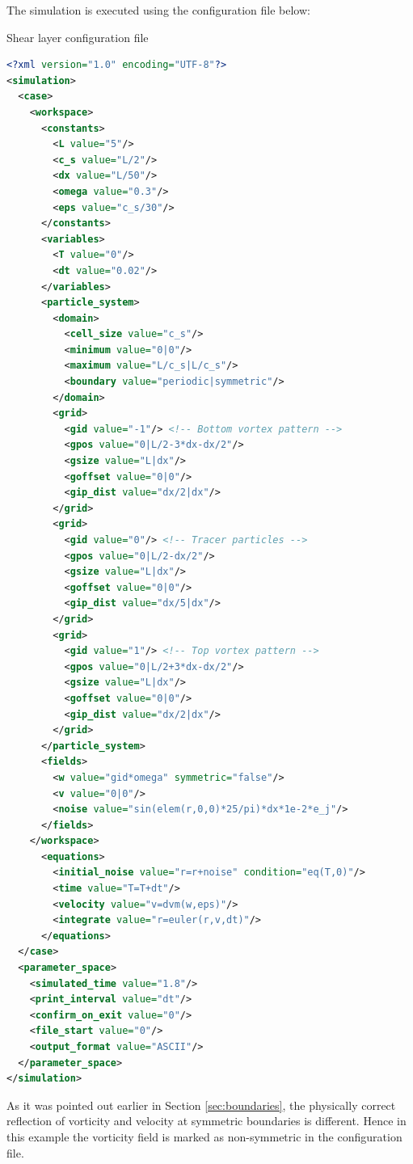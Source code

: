 \documentclass[a4paper,12pt,openany]{book}
\theoremstyle{break}
\begin{document}
The simulation is executed using the configuration file below:
\begin{samepage}
\begin{example}{Shear layer configuration file}{}
\lstset{basicstyle=\tiny}
\begin{lstlisting}[language=XML]
<?xml version="1.0" encoding="UTF-8"?>
<simulation>
  <case>
    <workspace>
      <constants>
        <L value="5"/>
        <c_s value="L/2"/>
        <dx value="L/50"/>
        <omega value="0.3"/>
        <eps value="c_s/30"/>
      </constants>
      <variables>
        <T value="0"/>
        <dt value="0.02"/>
      </variables>
      <particle_system>
        <domain>
          <cell_size value="c_s"/>
          <minimum value="0|0"/>
          <maximum value="L/c_s|L/c_s"/>
          <boundary value="periodic|symmetric"/>
        </domain>
        <grid>
          <gid value="-1"/> <!-- Bottom vortex pattern -->
          <gpos value="0|L/2-3*dx-dx/2"/>
          <gsize value="L|dx"/>
          <goffset value="0|0"/>
          <gip_dist value="dx/2|dx"/>
        </grid>
        <grid>
          <gid value="0"/> <!-- Tracer particles -->
          <gpos value="0|L/2-dx/2"/>
          <gsize value="L|dx"/>
          <goffset value="0|0"/>
          <gip_dist value="dx/5|dx"/>
        </grid>
        <grid>
          <gid value="1"/> <!-- Top vortex pattern -->
          <gpos value="0|L/2+3*dx-dx/2"/>
          <gsize value="L|dx"/>
          <goffset value="0|0"/>
          <gip_dist value="dx/2|dx"/>
        </grid>
      </particle_system>
      <fields>
        <w value="gid*omega" symmetric="false"/>
        <v value="0|0"/>
        <noise value="sin(elem(r,0,0)*25/pi)*dx*1e-2*e_j"/>
      </fields>
    </workspace>
      <equations>
        <initial_noise value="r=r+noise" condition="eq(T,0)"/>
        <time value="T=T+dt"/>
        <velocity value="v=dvm(w,eps)"/>
        <integrate value="r=euler(r,v,dt)"/>
      </equations>
  </case>
  <parameter_space>
    <simulated_time value="1.8"/>
    <print_interval value="dt"/>
    <confirm_on_exit value="0"/>
    <file_start value="0"/>
    <output_format value="ASCII"/>
  </parameter_space>
</simulation>
\end{lstlisting}
\end{example}
\end{samepage}
As it was pointed out earlier in Section \ref{sec:boundaries}, the physically correct reflection of vorticity and velocity at symmetric boundaries is different. Hence in this example the vorticity field is marked as non-symmetric in the configuration file.
\end{document}
